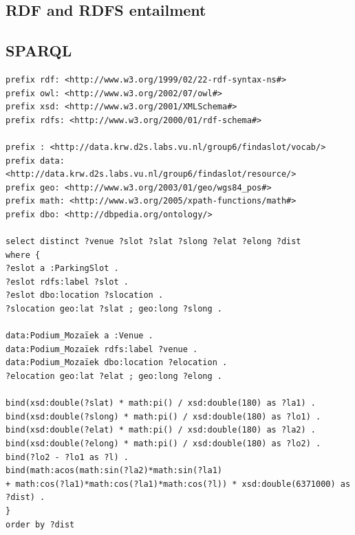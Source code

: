 \documentclass[runningheads,a4paper]{../../StyleFiles/llncs}
\begin{document}
\subsection{RDF and RDFS entailment}


\subsection{SPARQL}

\begin{lstlisting}[captionpos=b, caption=SPARQL query, label=lst:sparql,
basicstyle=\ttfamily,frame=bt]
prefix rdf: <http://www.w3.org/1999/02/22-rdf-syntax-ns#>
prefix owl: <http://www.w3.org/2002/07/owl#>
prefix xsd: <http://www.w3.org/2001/XMLSchema#>
prefix rdfs: <http://www.w3.org/2000/01/rdf-schema#>

prefix : <http://data.krw.d2s.labs.vu.nl/group6/findaslot/vocab/>
prefix data: <http://data.krw.d2s.labs.vu.nl/group6/findaslot/resource/>
prefix geo: <http://www.w3.org/2003/01/geo/wgs84_pos#>
prefix math: <http://www.w3.org/2005/xpath-functions/math#>
prefix dbo: <http://dbpedia.org/ontology/>

select distinct ?venue ?slot ?slat ?slong ?elat ?elong ?dist
where {
?eslot a :ParkingSlot .
?eslot rdfs:label ?slot .
?eslot dbo:location ?slocation .
?slocation geo:lat ?slat ; geo:long ?slong .

data:Podium_Mozaïek a :Venue .
data:Podium_Mozaïek rdfs:label ?venue .
data:Podium_Mozaïek dbo:location ?elocation .
?elocation geo:lat ?elat ; geo:long ?elong .

bind(xsd:double(?slat) * math:pi() / xsd:double(180) as ?la1) .
bind(xsd:double(?slong) * math:pi() / xsd:double(180) as ?lo1) .
bind(xsd:double(?elat) * math:pi() / xsd:double(180) as ?la2) .
bind(xsd:double(?elong) * math:pi() / xsd:double(180) as ?lo2) .
bind(?lo2 - ?lo1 as ?l) .
bind(math:acos(math:sin(?la2)*math:sin(?la1) 
+ math:cos(?la1)*math:cos(?la1)*math:cos(?l)) * xsd:double(6371000) as ?dist) .
}
order by ?dist

\end{lstlisting}
\end{document}
